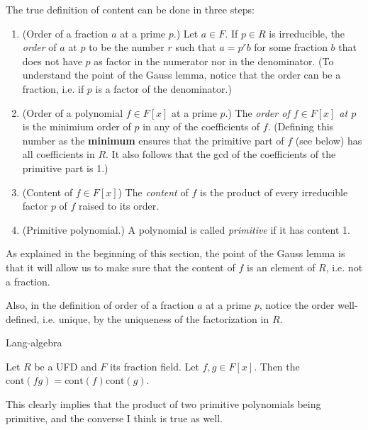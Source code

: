 \medskip\noindent
The true definition of content can be done in
three steps:
\begin{definition}
\label{definition-content}
\begin{reference}
\cite[p. 181]{Lang-algebra}
\end{reference}
\begin{enumerate}
\item (Order of a fraction $a$ at a prime
$p$.)
Let $a \in F$. If $p \in R$ is irreducible,
the {\it order} of $a$ at $p$
to be the number $r$ such that $a=p^rb$ for
some fraction $b$ that does not have
$p$ as factor in the numerator nor in the
denominator. (To understand the point
of the Gauss lemma, notice that the order
can be a fraction, i.e. if $p$ is a factor of
the denominator.)
\item (Order of a polynomial $f \in F[x]$ at
a prime $p$.)
The {\it  order of $f\in F[x]$ at $p$} is the
minimium order of
$p$ in any of the coefficients of $f$.
(Defining this number as the {\bf
minimum} ensures that the primitive part of
$f$ (see below) has all coefficients
in $R$. It also follows that the gcd of the
coefficients of the primitive part is 1.)
\item (Content of $f \in F[x]$) The {\it
content} of $f$ is the product
of every irreducible factor $p$ of $f$ raised
to its order.
\item (Primitive polynomial.) A polynomial is
called {\it primitive} if it has content 1.
\end{enumerate}
\end{definition}

As explained in the beginning of this
section, the point of the Gauss
lemma is that it will allow us to make sure
that the content of $f$ is an
element of $R$, i.e. not a fraction.

Also, in the definition of order of a
fraction $a$ at a prime $p$, notice
 the order well-defined, i.e. unique, by the
 uniqueness of the factorization
in $R$.

\begin{lemma}
\label{lemma-true-Gauss}
\begin{reference}
\cite{Chapter 4, Theorem 2.1}{Lang-algebra}
\end{reference}
Let $R$ be a UFD and $F$ its fraction field.
Let $f,g\in F[x]$. Then the
$\text{cont}(fg)=\text{cont}(f)\text{cont}(g)
$.
\end{lemma}

This clearly implies that the product of two
primitive polynomials being
primitive, and the converse I think is true
as well.

